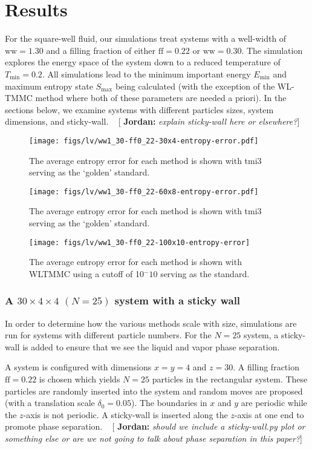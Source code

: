 \documentclass[letterpaper,twocolumn,amsmath,amssymb,pre,aps,10pt]{revtex4-1}
\newcommand{\blue}[1]{{\bf \color{blue} #1}}
\newcommand{\jpsays}[1]{{\color{red} [\blue{Jordan:} \emph{#1}]}}
\begin{document}
\section{Results}

For the square-well fluid, our simulations treat systems with a
well-width of $\text{ww} = 1.30$ and a filling fraction of either
$\text{ff} = 0.22$ or $\text{ww} = 0.30$.  The simulation explores the
energy space of the system down to a reduced temperature of
$T_{\text{min}} = 0.2$.  All simulations lead to the minimum important
energy $E_{\text{min}}$ and maximum entropy state $S_{\text{max}}$
being calculated (with the exception of the WL-TMMC method where both
of these parameters are needed a priori).  In the sections below, we
examine systems with different particles sizes, system dimensions, and
sticky-wall. ~\jpsays{explain sticky-wall here or elsewhere?}

\begin{figure}
  \texttt{[image: figs/lv/ww1\_30-ff0\_22-30x4-entropy-error.pdf]}
  \caption{The average entropy error for each method is shown with tmi3 serving as
  the `golden' standard.}\label{fig:avgS-30x4}
\end{figure}
\begin{figure}
  \texttt{[image: figs/lv/ww1\_30-ff0\_22-60x8-entropy-error.pdf]}
  \caption{The average entropy error for each method is shown with tmi3 serving as
  the `golden' standard.}\label{fig:avgS-60x8}
\end{figure}
\begin{figure}
  \texttt{[image: figs/lv/ww1\_30-ff0\_22-100x10-entropy-error]}
  \caption{The average entropy error for each method is shown with
    WLTMMC using a cutoff of 10$^-10$ serving as the
    standard.}\label{fig:avgS-100x10}
\end{figure}

\subsubsection{A $30\times4\times4$ $(N = 25)$ system with a sticky
wall}
In order to determine how the various methods scale with size,
simulations are run for systems with different particle numbers.  For
the $N = 25$ system, a sticky-wall is added to ensure that we see the
liquid and vapor phase separation.

A system is configured with dimensions $x = y = 4$ and $z = 30$.  A
filling fraction $\text{ff} = 0.22$ is chosen which yields $N = 25$
particles in the rectangular system.  These particles are randomly
inserted into the system and random moves are proposed (with a
translation scale $\delta_0 = 0.05$). The boundaries in $x$ and $y$ are
periodic while the $z$-axis is not periodic.  A sticky-wall is inserted
along the $z$-axis at one end to promote phase separation.
~\jpsays{should we include a sticky-wall.py plot or something else or are
we not going to talk about phase separation in this paper?}
\end{document}
